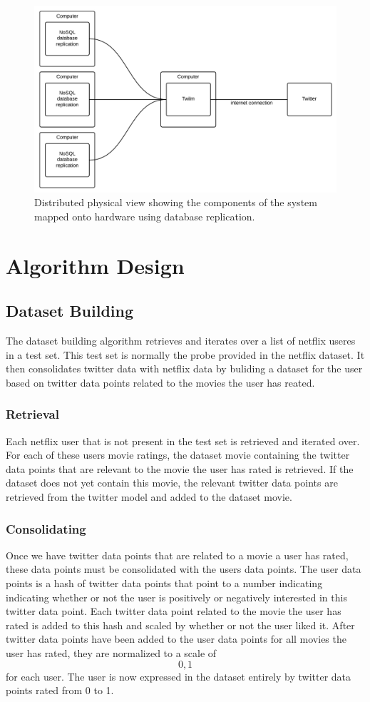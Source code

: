 \begin{figure}[H]
\centerline{\includegraphics[width=4.5in]{image/architecture-physical-view-distributed.png}}
\caption{Distributed physical view showing the components of the system mapped onto hardware using database replication.}
\label{figure:development-view}
\end{figure}

\section{Algorithm Design}
\subsection{Dataset Building}
The dataset building algorithm retrieves and iterates over a list of netflix useres in a test set. This test set is normally the probe provided in the netflix dataset. It then consolidates twitter data with netflix data by buliding a dataset for the user based on twitter data points related to the movies the user has reated.

\subsubsection{Retrieval}
	Each netflix user that is not present in the test set is retrieved and iterated over. For each of these users movie ratings, the dataset movie containing the twitter data points that are relevant to the movie the user has rated is retrieved. If the dataset does not yet contain this movie, the relevant twitter data points are retrieved from the twitter model and added to the dataset movie.

\subsubsection{Consolidating}
	Once we have twitter data points that are related to a movie a user has rated, these data points must be consolidated with the users data points. The user data points is a hash of twitter data points that point to a number indicating indicating whether or not the user is positively or negatively interested in this twitter data point. Each twitter data point related to the movie the user has rated is added to this hash and scaled by whether or not the user liked it. After twitter data points have been added to the user data points for all movies the user has rated, they are normalized to a scale of \[0, 1\] for each user. The user is now expressed in the dataset entirely by twitter data points rated from 0 to 1.

